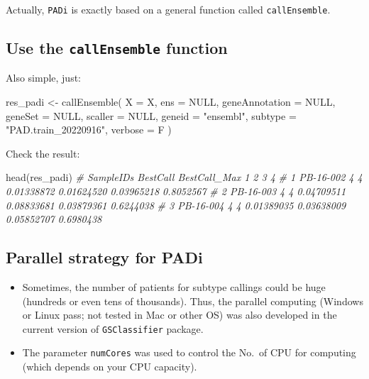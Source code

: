 \documentclass[
  12pt,
]{book}
\newenvironment{Shaded}{\begin{snugshade}}{\end{snugshade}}
\newcommand{\AttributeTok}[1]{\textcolor[rgb]{0.77,0.63,0.00}{#1}}
\newcommand{\CommentTok}[1]{\textcolor[rgb]{0.56,0.35,0.01}{\textit{#1}}}
\newcommand{\ConstantTok}[1]{\textcolor[rgb]{0.00,0.00,0.00}{#1}}
\newcommand{\FunctionTok}[1]{\textcolor[rgb]{0.00,0.00,0.00}{#1}}
\newcommand{\NormalTok}[1]{#1}
\newcommand{\OtherTok}[1]{\textcolor[rgb]{0.56,0.35,0.01}{#1}}
\newcommand{\StringTok}[1]{\textcolor[rgb]{0.31,0.60,0.02}{#1}}
\begin{document}
Actually, \texttt{PADi} is exactly based on a general function called \texttt{callEnsemble}.

\hypertarget{use-the-callensemble-function}{%
\subsection{\texorpdfstring{Use the \texttt{callEnsemble} function}{Use the callEnsemble function}}\label{use-the-callensemble-function}}

Also simple, just:

\begin{Shaded}
\begin{Highlighting}[]
\NormalTok{res\_padi }\OtherTok{\textless{}{-}} \FunctionTok{callEnsemble}\NormalTok{(}
    \AttributeTok{X =}\NormalTok{ X,}
    \AttributeTok{ens =} \ConstantTok{NULL}\NormalTok{,}
    \AttributeTok{geneAnnotation =} \ConstantTok{NULL}\NormalTok{,}
    \AttributeTok{geneSet =} \ConstantTok{NULL}\NormalTok{,}
    \AttributeTok{scaller =} \ConstantTok{NULL}\NormalTok{,}
    \AttributeTok{geneid =} \StringTok{"ensembl"}\NormalTok{,}
    \AttributeTok{subtype =} \StringTok{"PAD.train\_20220916"}\NormalTok{,}
    \AttributeTok{verbose =}\NormalTok{ F}
\NormalTok{  )}
\end{Highlighting}
\end{Shaded}

Check the result:

\begin{Shaded}
\begin{Highlighting}[]
\FunctionTok{head}\NormalTok{(res\_padi)}
\CommentTok{\#   SampleIDs BestCall BestCall\_Max          1          2          3         4}
\CommentTok{\# 1 PB{-}16{-}002        4            4 0.01338872 0.01624520 0.03965218 0.8052567}
\CommentTok{\# 2 PB{-}16{-}003        4            4 0.04709511 0.08833681 0.03879361 0.6244038}
\CommentTok{\# 3 PB{-}16{-}004        4            4 0.01389035 0.03638009 0.05852707 0.6980438}
\end{Highlighting}
\end{Shaded}

\hypertarget{parallel-strategy-for-padi}{%
\subsection{Parallel strategy for PADi}\label{parallel-strategy-for-padi}}

\begin{itemize}
\item
  Sometimes, the number of patients for subtype callings could be huge (hundreds or even tens of thousands). Thus, the parallel computing (Windows or Linux pass; not tested in Mac or other OS) was also developed in the current version of \texttt{GSClassifier} package.
\item
  The parameter \texttt{numCores} was used to control the No.~of CPU for computing (which depends on your CPU capacity).
\end{itemize}
\end{document}
